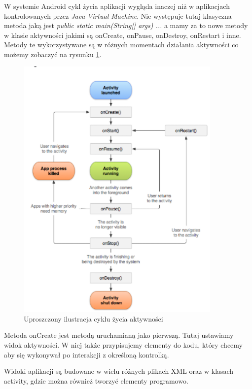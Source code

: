 \documentclass[a4paper,12pt, twoside]{article}
\begin{document}
    	W systemie Android cykl życia aplikacji wygląda inaczej niż w aplikacjach kontrolowanych przez \textit{Java Virtual Machine}\cite{jvm}. Nie występuje tutaj klasyczna metoda jaką jest \textit{public static main(String[] args) {...}} a mamy za to nowe metody w klasie aktywności jakimi są onCreate, onPause, onDestroy, onRestart i inne. Metody te wykorzystywane są w różnych momentach działania aktywności co możemy zobaczyć na rysunku \ref{fig:lifecycle}.
    
    	
    	\begin{figure}[H]
    	        \centering
    			\vspace{.5cm}
    			\includegraphics[width=10cm]{images/rys6_androidlifecycle.png}
    			\vspace{.5cm}
    			\caption{Uproszczony ilustracja cyklu życia aktywności\cite{lifecycle}}
                \label{fig:lifecycle}
    	\end{figure}
    	
    	Metoda onCreate jest metodą uruchamianą jako pierwszą. Tutaj ustawiamy widok aktywności. W niej także przypisujemy elementy do kodu, który chcemy aby się wykonywał po interakcji z określoną kontrolką.
    		
    	Widoki aplikacji są budowane w wielu różnych plikach XML oraz w klasach activity, gdzie można również tworzyć elementy programowo.
    	
\end{document}
